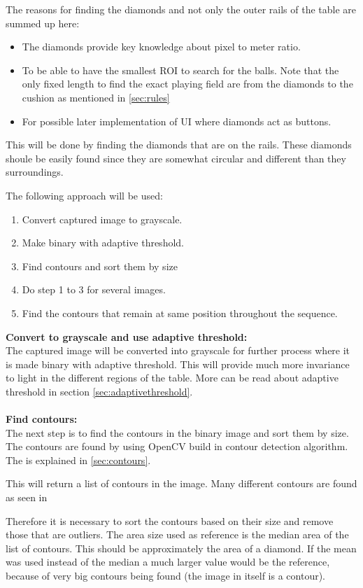 The reasons for finding the diamonds and not only the outer rails of the table are summed up here:

\begin{itemize}
	\item The diamonds provide key knowledge about pixel to meter ratio.
	\item To be able to have the smallest ROI to search for the balls. Note that the only fixed length to find the exact playing field are from the diamonds to the cushion as mentioned in \ref{sec:rules}
	\item For possible later implementation of UI where diamonds act as buttons.
\end{itemize}

This will be done by finding the diamonds that are on the rails. These diamonds shoule be easily found since they are somewhat circular and different than they surroundings. 

The following approach will be used:
\begin{enumerate}
\item Convert captured image to grayscale.
\item Make binary with adaptive threshold.
\item Find contours and sort them by size
\item Do step 1 to 3 for several images.
\item Find the contours that remain at same position throughout the sequence.
\end{enumerate}

\textbf{Convert to grayscale and use adaptive threshold:}\\
The captured image will be converted into grayscale for further process where it is made binary with adaptive threshold. This will provide much more invariance to light in the different regions of the table. More can be read about adaptive threshold in section \ref{sec:adaptivethreshold}.\\
\\
\textbf{Find contours:}\\
The next step is to find the contours in the binary image and sort them by size. The contours are found by using OpenCV build in contour detection algorithm. The is explained in \ref{sec:contours}.

This will return a list of contours in the image. Many different contours are found as seen in %

Therefore it is necessary to sort the contours based on their size and remove those that are outliers. The area size used as reference is the median area of the list of contours. This should be approximately the area of a diamond. If the mean was used instead of the median a much larger value would be the reference, because of very big contours being found (the image in itself is a contour).

